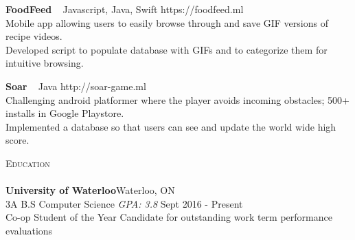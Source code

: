 \documentclass[a4paper]{article}
\newcommand{\lineunder} {
    \vspace*{-8pt} \\
    \hspace*{-18pt} \hrulefill \\
}
\newcommand{\header} [1] {
    {\hspace*{-18pt}\vspace*{6pt} \textsc{#1}}
    \vspace*{-6pt} \lineunder
}
\begin{document}
{\textbf{FoodFeed}} {\ \textbar{} Javascript, Java, Swift} \hfill https://foodfeed.ml\\
Mobile app allowing users to easily browse through and save GIF versions of recipe videos.\\
Developed script to populate database with GIFs and to categorize them for intuitive browsing. \\
\vspace*{2mm}

{\textbf{Soar}} {\ \textbar{} Java} \hfill http://soar-game.ml\\
Challenging android platformer where the player avoids incoming obstacles; 500+ installs in Google Playstore.\\
Implemented a database so that users can see and update the world wide high score.\\
\vspace*{2mm}

\header{Education}
\textbf{University of Waterloo}\hfill Waterloo, ON\\
3A B.S Computer Science \textit{GPA: 3.8} \hfill Sept 2016 - Present\\
Co-op Student of the Year Candidate for outstanding work term performance evaluations


\vspace{2mm}

\ 
\end{document}
